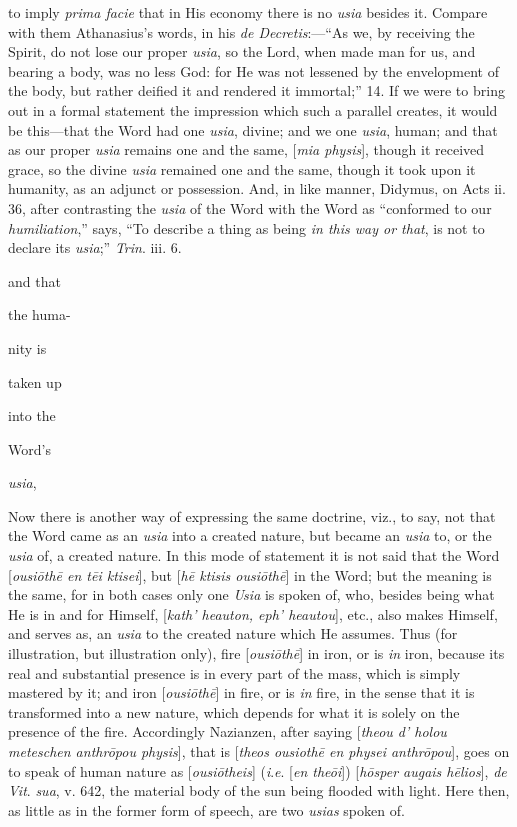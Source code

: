 to imply \emph{prima facie} that in His economy there is no \emph{usia}
besides it. Compare with them Athanasius's words, in his \emph{de
Decretis}:—``As we, by receiving the Spirit, do not lose
our proper \emph{usia}, so the Lord, when made man for us, and
bearing a body, was no less God: for He was not lessened by
the envelopment of the body, but rather deified it and
rendered it immortal;'' 14. If we were to bring out in a
formal statement the impression which such a parallel creates,
it would be this—that the Word had one \emph{usia}, divine;
and we one \emph{usia}, human; and that as our proper \emph{usia}
remains one and the same, [\emph{mia physis}], though it
received grace, so the divine \emph{usia} remained one and the
same, though it took upon it humanity, as an adjunct or
possession. And, in like manner, Didymus, on Acts ii. 36,
after contrasting the \emph{usia} of the Word with the Word as
``conformed to our \emph{humiliation},'' says, ``To
describe a thing as being \emph{in this way or that}, is not
to declare its \emph{usia};'' \emph{Trin}. iii. 6.

and that

the huma-

nity is

taken up

into the

Word's

\emph{usia},

Now there is another way
of expressing the same doctrine, viz., to say, not that the
Word came as an \emph{usia} into a created nature, but became
an \emph{usia} to, or the \emph{usia} of, a created
nature. In this mode of statement it is not said that the Word
[\emph{ousi\={o}th\={e} en t\={e}i ktisei}], but [\emph{h\={e}
ktisis ousi\={o}th\={e}}] in the Word; but the
meaning is the same, for in both cases only one \emph{Usia} is
spoken of, who, besides being what He is in and for Himself, [\emph{kath'
heauton, eph' heautou}], etc., also makes Himself, and
serves as, an \emph{usia} to the created nature which He
assumes. Thus (for illustration, but illustration only), fire
[\emph{ousi\={o}th\={e}}] in iron, or is \emph{in} iron,
because its real and substantial presence is in every part of
the mass, which is simply mastered by it; and iron [\emph{ousi\={o}th\={e}}]
in fire, or is \emph{in} fire, in the sense that it is
transformed into a new nature, which depends for what it is
solely on the presence of the fire. Accordingly Nazianzen,
after saying [\emph{theou d' holou meteschen anthr\={o}pou
physis}], that is [\emph{theos ousioth\={e} en physei anthr\={o}pou}],
goes on to speak of human nature as [\emph{ousi\={o}theis}]
(\emph{i}.\emph{e}. [\emph{en the\={o}i}]) [\emph{h\={o}sper
augais h\={e}lios}], \emph{de Vit}. \emph{sua}, v. 642,
the material body of the sun being flooded with light. Here
then, as little as in the former form of speech, are two \emph{usias}
spoken of.

